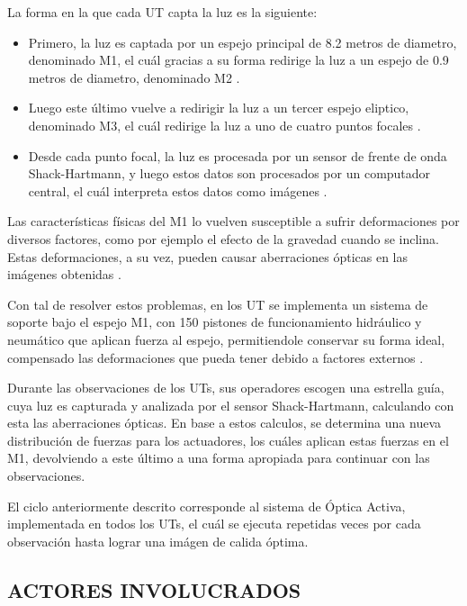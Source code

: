 La forma en la que cada UT capta la luz es la siguiente:

\begin{itemize}
    \item Primero, la luz es captada por un espejo principal de 8.2 metros de diametro, denominado M1, el cuál gracias a su forma redirige la luz a un espejo de 0.9 metros de diametro, denominado M2 \cite{eso1998vlt}.

    \item Luego este último vuelve a redirigir la luz a un tercer espejo eliptico, denominado M3, el cuál redirige la luz a uno de cuatro puntos focales \cite{eso1998vlt}.

    \item Desde cada punto focal, la luz es procesada por un sensor de frente de onda Shack-Hartmann, y luego estos datos son procesados por un computador central, el cuál interpreta estos datos como imágenes \cite{eso1998vlt}.
\end{itemize}

Las características físicas del M1 lo vuelven susceptible a sufrir deformaciones por diversos factores, como por ejemplo el efecto de la gravedad cuando se inclina. Estas deformaciones, a su vez, pueden causar aberraciones ópticas en las imágenes obtenidas \cite{wilson1987active}.

Con tal de resolver estos problemas, en los UT se implementa un sistema de soporte bajo el espejo M1, con 150 pistones de funcionamiento hidráulico y neumático que aplican fuerza al espejo, permitiendole conservar su forma ideal, compensado las deformaciones que pueda tener debido a factores externos \cite{eso1998vlt}. 

Durante las observaciones de los UTs, sus operadores escogen una estrella guía, cuya luz es capturada y analizada por el sensor Shack-Hartmann, calculando con esta las aberraciones ópticas. En base a estos calculos, se determina una nueva distribución de fuerzas para los actuadores, los cuáles aplican estas fuerzas en el M1, devolviendo a este último a una forma apropiada para continuar con las observaciones\cite{eso1998vlt}. 

El ciclo anteriormente descrito corresponde al sistema de Óptica Activa, implementada en todos los UTs, el cuál se ejecuta repetidas veces por cada observación hasta lograr una imágen de calida óptima\cite{eso1998vlt}.

\subsection{ACTORES INVOLUCRADOS}

